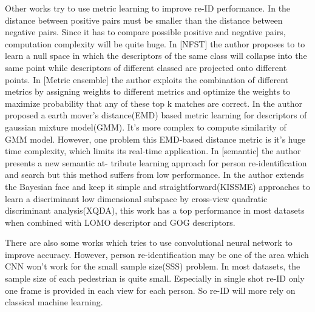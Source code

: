 \documentclass[conference,compsoc]{IEEEtran}
\begin{document}
Other works try to use metric learning to improve re-ID performance. In \cite{PRDC} the distance between positive pairs must be smaller than the distance between negative pairs. Since it has to compare possible positive and negative pairs, computation complexity will be quite huge. In [NFST] the author proposes to to learn a null space in which the descriptors of the same class will collapse into the same point while descriptors of different classed are projected onto different points. In [Metric ensemble] the author exploits the combination of different metrics by assigning weights to different metrics and optimize the weights to maximize probability that any of these top k matches are correct. In \cite{novelEMD} the author proposed a earth mover's distance(EMD) based metric learning for descriptors of gaussian mixture model(GMM). It's more complex to compute similarity of GMM model. However, one problem this EMD-based distance metric is it's huge time complexity, which limits its real-time application. In [semantic] the author presents a new semantic at- tribute learning approach for person re-identification and search but this method suffers from low performance. In \cite{LOMO} the author extends the Bayesian face and keep it simple and straightforward(KISSME) approaches to learn a discriminant low dimensional subspace by cross-view quadratic discriminant analysis(XQDA), this work has a top performance in most datasets when combined with LOMO descriptor and GOG descriptors. 

There are also some works which tries to use convolutional neural network \cite{PersonNetCNN,RecurrentCNN} to improve accuracy. However, person re-identification may be one of the area which CNN won't work for the small sample size(SSS) problem. In most datasets, the sample size of each pedestrian is quite small. Especially in single shot re-ID only one frame is provided in each view for each person. So re-ID will more rely on classical machine learning.
\end{document}
